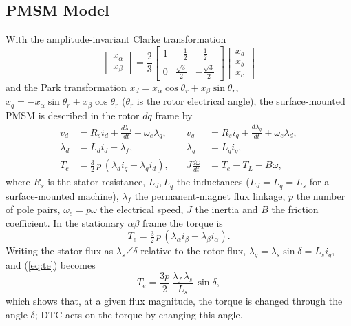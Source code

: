 \documentclass[12pt,a4paper,onecolumn]{IEEEtran}
\begin{document}
\subsection{PMSM Model}
With the amplitude-invariant Clarke transformation
\begin{equation}
\begin{bmatrix} x_\alpha\\ x_\beta \end{bmatrix} = \frac{2}{3}\begin{bmatrix} 1 & -\tfrac12 & -\tfrac12\\[2pt] 0 & \tfrac{\sqrt3}{2} & -\tfrac{\sqrt3}{2} \end{bmatrix}\begin{bmatrix} x_a\\ x_b\\ x_c \end{bmatrix} \label{eq:clarke}
\end{equation}
and the Park transformation $x_d = x_\alpha\cos\theta_r + x_\beta\sin\theta_r$, $x_q = -x_\alpha\sin\theta_r + x_\beta\cos\theta_r$ ($\theta_r$ is the rotor electrical angle), the surface-mounted PMSM is described in the rotor $dq$ frame by \cite{pillay1989}
\begin{align}
v_d &= R_s i_d + \frac{d\lambda_d}{dt} - \omega_e \lambda_q, &\quad v_q &= R_s i_q + \frac{d\lambda_q}{dt} + \omega_e \lambda_d, \label{eq:vdq}\\
\lambda_d &= L_d i_d + \lambda_f, &\quad \lambda_q &= L_q i_q, \label{eq:lam}\\
T_e &= \tfrac{3}{2}\,p\,(\lambda_d i_q - \lambda_q i_d), &\quad J\frac{d\omega}{dt} &= T_e - T_L - B\omega, \label{eq:te}
\end{align}
where $R_s$ is the stator resistance, $L_d,L_q$ the inductances ($L_d=L_q=L_s$ for a surface-mounted machine), $\lambda_f$ the permanent-magnet flux linkage, $p$ the number of pole pairs, $\omega_e=p\omega$ the electrical speed, $J$ the inertia and $B$ the friction coefficient. In the stationary $\alpha\beta$ frame the torque is
\begin{equation}
T_e = \tfrac{3}{2}\,p\,(\lambda_\alpha i_\beta - \lambda_\beta i_\alpha). \label{eq:teab}
\end{equation}
Writing the stator flux as $\lambda_s\angle\delta$ relative to the rotor flux, $\lambda_q=\lambda_s\sin\delta = L_s i_q$, and (\ref{eq:te}) becomes
\begin{equation}
T_e = \frac{3p}{2}\,\frac{\lambda_f\,\lambda_s}{L_s}\,\sin\delta, \label{eq:angle}
\end{equation}
which shows that, at a given flux magnitude, the torque is changed through the angle $\delta$; DTC acts on the torque by changing this angle.
\end{document}
